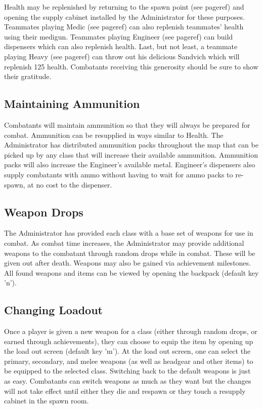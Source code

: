 Health may be replenished by returning to the spawn point (see {{pageref}}) and opening the supply cabinet installed by the Administrator for these purposes. Teammates playing Medic (see {{pageref}}) can also replenish teammates' health using their medigun. Teammates playing Engineer (see {{pageref}}) can build dispensers which can also replenish health. Last, but not least, a teammate playing Heavy (see {{pageref}}) can throw out his delicious Sandvich which will replenish 125 health.  Combatants receiving this generosity should be sure to show their gratitude.

\subsection{Maintaining Ammunition}
Combatants will maintain ammunition so that they will always be prepared for combat.  Ammunition can be resupplied in ways similar to Health.  The Administrator has distributed ammunition packs throughout the map that can be picked up by any class that will increase their available ammunition.  Ammunition packs will also increase the Engineer's available metal.  Engineer's dispensers also supply combatants with ammo without having to wait for ammo packs to re-spawn, at no cost to the dispenser.

\subsection{Weapon Drops}
The Administrator has provided each class with a base set of weapons for use in combat.  As combat time increases, the Administrator may provide additional weapons to the combatant through random drops while in combat. These will be given out after death.  Weapons may also be gained via achievement milestones. All found weapons and items can be viewed by opening the backpack (default key 'n'). 

\subsection{Changing Loadout}
Once a player is given a new weapon for a class (either through random drops, or earned through achievements), they can choose to equip the item by opening up the load out screen (default key 'm'). At the load out screen, one can select the primary, secondary, and melee weapons (as well as headgear and other items) to be equipped to the selected class.  Switching back to the default weapons is just as easy. Combatants can switch weapons as much as they want but the changes will not take effect until either they die and respawn or they touch a resupply cabinet in the spawn room.

